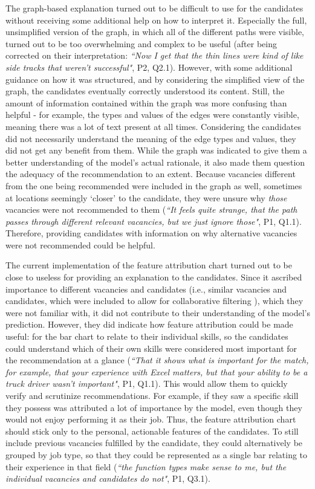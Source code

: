 The graph-based explanation turned out to be difficult to use for the candidates without receiving some additional help on how to interpret it. Especially the full, unsimplified version of the graph, in which all of the different paths were visible, turned out to be too overwhelming and complex to be useful (after being corrected on their interpretation: \textit{``Now I get that the thin lines were kind of like side tracks that weren't successful"}, P2, Q2.1). However, with some additional guidance on how it was structured, and by considering the simplified view of the graph, the candidates eventually correctly understood its content. Still, the amount of information contained within the graph was more confusing than helpful - for example, the types and values of the edges were constantly visible, meaning there was a lot of text present at all times. Considering the candidates did not necessarily understand the meaning of the edge types and values, they did not get any benefit from them. While the graph was indicated to give them a better understanding of the model's actual rationale, it also made them question the adequacy of the recommendation to an extent. Because vacancies different from the one being recommended were included in the graph as well, sometimes at locations seemingly `closer' to the candidate, they were unsure why \emph{those} vacancies were not recommended to them (\textit{``It feels quite strange, that the path passes through different relevant vacancies, but we just ignore those"}, P1, Q1.1). Therefore, providing candidates with information on why alternative vacancies were not recommended could be helpful. 

The current implementation of the feature attribution chart turned out to be close to useless for providing an explanation to the candidates. Since it ascribed importance to different vacancies and candidates (i.e., similar vacancies and candidates, which were included to allow for collaborative filtering \cite{su2009survey}), which they were not familiar with, it did not contribute to their understanding of the model's prediction. However, they did indicate how feature attribution could be made useful: for the bar chart to relate to their individual skills, so the candidates could understand which of their own skills were considered most important for the recommendation at a glance (\textit{``That it shows what is important for the match, for example, that your experience with Excel matters, but that your ability to be a truck driver wasn't important"}, P1, Q1.1). This would allow them to quickly verify and scrutinize recommendations. For example, if they saw a specific skill they possess was attributed a lot of importance by the model, even though they would not enjoy performing it as their job. Thus, the feature attribution chart should stick only to the personal, actionable features of the candidates. To still include previous vacancies fulfilled by the candidate, they could alternatively be grouped by job type, so that they could be represented as a single bar relating to their experience in that field (\textit{``the function types make sense to me, but the individual vacancies and candidates do not"}, P1, Q3.1). 


